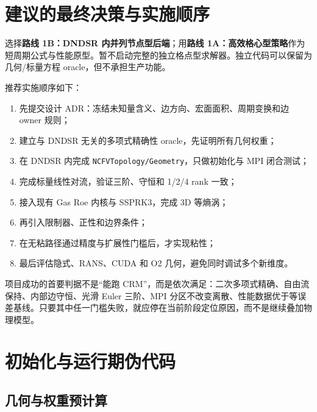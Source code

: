 \documentclass[UTF8,a4paper,11pt,openany]{ctexrep}
\numberwithin{equation}{chapter}
\newcommand{\code}[1]{\texttt{#1}}
\begin{document}
\chapter{建议的最终决策与实施顺序}

\begin{conclusionbox}[决策]
选择\textbf{路线 1B：DNDSR 内并列节点型后端}；用\textbf{路线 1A：高效格心型策略}作为短周期公式与性能原型。暂不启动完整的独立格点型求解器。独立代码可以保留为几何/标量方程 oracle，但不承担生产功能。
\end{conclusionbox}

推荐实施顺序如下：

\begin{enumerate}
  \item 先提交设计 ADR：冻结未知量含义、边方向、宏面面积、周期变换和边 owner 规则；
  \item 建立与 DNDSR 无关的多项式精确性 oracle，先证明所有几何权重；
  \item 在 DNDSR 内完成 \code{NCFVTopology/Geometry}，只做初始化与 MPI 闭合测试；
  \item 完成标量线性对流，验证三阶、守恒和 1/2/4 rank 一致；
  \item 接入现有 Gas Roe 内核与 SSPRK3，完成 3D 等熵涡；
  \item 再引入限制器、正性和边界条件；
  \item 在无粘路径通过精度与扩展性门槛后，才实现粘性；
  \item 最后评估隐式、RANS、CUDA 和 O2 几何，避免同时调试多个新维度。
\end{enumerate}

项目成功的首要判据不是“能跑 CRM”，而是依次满足：二次多项式精确、自由流保持、内部边守恒、光滑 Euler 三阶、MPI 分区不改变离散、性能数据优于等误差基线。只要其中任一门槛失败，就应停在当前阶段定位原因，而不是继续叠加物理模型。

\appendix

\chapter{初始化与运行期伪代码}

\section{几何与权重预计算}
\end{document}
